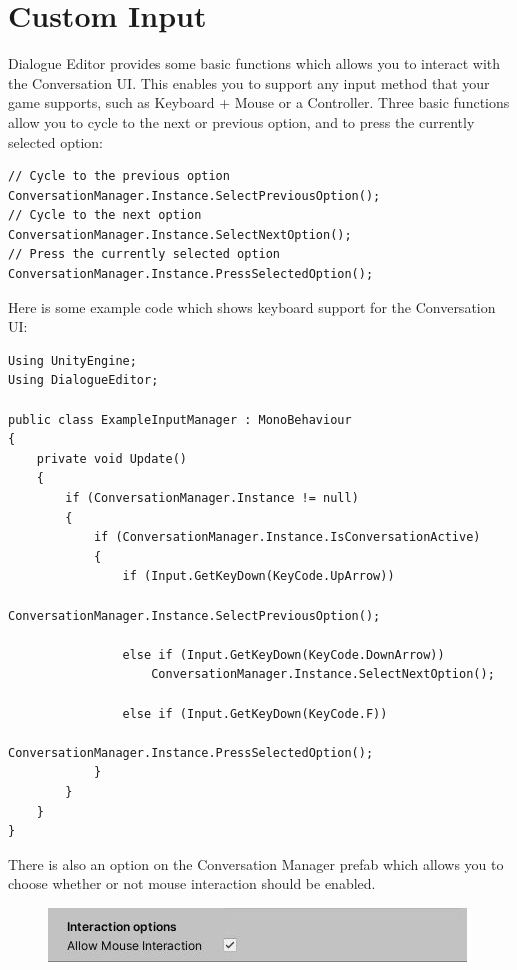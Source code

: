 \documentclass[a4paper,12pt]{article}
\begin{document}
\newpage




\hypertarget{_custominput}{}
\section{Custom Input}
Dialogue Editor provides some basic functions which allows you to interact with the Conversation UI. This enables you to support any input method that your game supports, such as Keyboard + Mouse or a Controller.
\newline
Three basic functions allow you to cycle to the next or previous option, and to press the currently selected option:
\bigskip

\begin{lstlisting}
// Cycle to the previous option
ConversationManager.Instance.SelectPreviousOption();
// Cycle to the next option
ConversationManager.Instance.SelectNextOption();
// Press the currently selected option
ConversationManager.Instance.PressSelectedOption();
\end{lstlisting}
\bigskip

Here is some example code which shows keyboard support for the Conversation UI:
\bigskip

\begin{lstlisting}
Using UnityEngine;
Using DialogueEditor;

public class ExampleInputManager : MonoBehaviour
{
	private void Update()	
	{
		if (ConversationManager.Instance != null)
		{
			if (ConversationManager.Instance.IsConversationActive)
			{
				if (Input.GetKeyDown(KeyCode.UpArrow))
					ConversationManager.Instance.SelectPreviousOption();
					    
				else if (Input.GetKeyDown(KeyCode.DownArrow))
					ConversationManager.Instance.SelectNextOption();
					
				else if (Input.GetKeyDown(KeyCode.F))
					ConversationManager.Instance.PressSelectedOption();
			}
		}
	}
}
\end{lstlisting}
\bigskip

There is also an option on the Conversation Manager prefab which allows you to choose whether or not mouse interaction should be enabled.

\begin{figure}[ht]
\centering
\includegraphics[keepaspectratio]{img/AllowMouseInteraction.png}
\end{figure}
\end{document}
